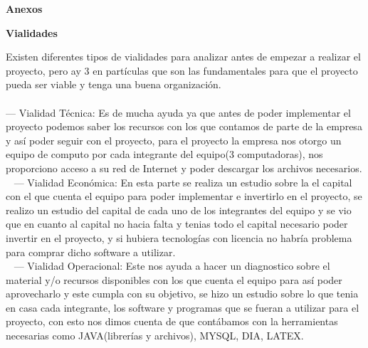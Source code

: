 \documentclass[10pt,a4paper]{report}
\begin{document}
\begin{titlepage}
\begin{titlepage}
{\Large\bfseries \center  Anexos \par}
{\Large\bfseries \center  Vialidades \par}
 \vspace{.5cm}
 \justify
 Existen diferentes tipos de vialidades para analizar antes de empezar a realizar el proyecto, pero ay 3 en partículas que son las fundamentales para que el proyecto pueda ser viable y tenga una buena organización.\\\\
 \vspace{.5cm}
 \justify
--- Vialidad Técnica: Es de mucha ayuda ya que antes de poder implementar el proyecto podemos saber los recursos con los que contamos de parte de la empresa y así poder seguir con el proyecto, para el proyecto la empresa nos otorgo un equipo de computo por cada integrante del equipo(3 computadoras), nos proporciono acceso a su red de Internet y poder descargar los archivos necesarios.\\\
 \vspace{.5cm}
 \justify
--- Vialidad Económica: En esta parte se realiza un estudio sobre la el capital con el que cuenta el equipo para poder implementar e invertirlo en el proyecto, se realizo un estudio del capital de cada uno de los integrantes del equipo y se vio que en cuanto al capital no hacia falta y tenias todo el capital necesario poder invertir en el proyecto, y si hubiera tecnologías con licencia no habría problema para comprar dicho software a utilizar.\\\
 \vspace{.5cm}
 \justify
--- Vialidad Operacional: Este nos ayuda a hacer un diagnostico sobre el material y/o recursos disponibles con los que cuenta el equipo para así poder aprovecharlo y este cumpla con su objetivo, se hizo un estudio sobre lo que tenia en casa cada integrante, los software y programas que se fueran a utilizar para el proyecto, con esto nos dimos cuenta de que contábamos con la herramientas necesarias como JAVA(librerías y archivos), MYSQL, DIA, LATEX.
\end{titlepage}
\end{titlepage}
\end{document}

